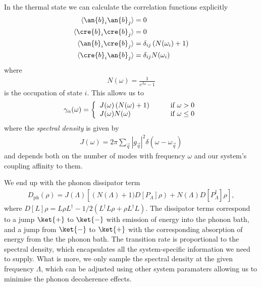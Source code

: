 In the thermal state we can calculate the correlation functions explicitly
\begin{align}
  \langle \an{b}_i \an{b}_j \rangle &= 0 \\
  \langle \cre{b}_i \cre{b}_j \rangle &= 0 \\
  \langle \an{b}_i \cre{b}_j \rangle &= \delta_{ij} \left( N(\omega_i) +1 \right) \\
  \langle \cre{b}_i \an{b}_j \rangle &= \delta_{ij} N(\omega_i)
\end{align}
where
\begin{align}
  N(\omega) = \frac{1}{e^{\beta \omega} - 1}
\end{align}
is the occupation of state $i$. This allows us to 
\begin{align}
  \gamma_\alpha(\omega) = \left\{
    \begin{array}{l l}
    J(\omega)\left(N(\omega) + 1\right) & \qquad \text{if $\omega > 0$}\\
    J(\omega)N(\omega) & \qquad \text{if $\omega \leq 0$}
  \end{array} \right.
\end{align}
where the \textit{spectral density} is given by
\begin{align}
  J(\omega) = 2\pi \sum_\vec{q} |g_\vec{q}|^2 \delta(\omega-\omega_\vec{q})
\end{align}
and depends both on the number of modes with frequency $\omega$ and our system's coupling affinity to them.

We end up with the phonon dissipator term
\begin{align}
  D_\text{ph}(\rho) = J(\Lambda)\left[\left(N(\Lambda) + 1)D[P_\Lambda]\rho\right) + N(\Lambda)D[P^\dagger_\Lambda]\rho \right],
\end{align}
where $D[L]\rho = L\rho L^\dagger -1/2(L^\dagger L\rho + \rho L^\dagger L)$. The dissipator terms correspond to a jump $\ket{+}$ to $\ket{-}$ with emission of energy into the phonon bath, and a jump from $\ket{-}$ to $\ket{+}$ with the corresponding absorption of energy from the the phonon bath. The transition rate is proportional to the spectral density, which encapsulates all the system-specific information we need to supply. What is more, we only sample the spectral density at the given frequency $\Lambda$, which can be adjusted using other system paramaters allowing us to minimise the phonon decoherence effects.
